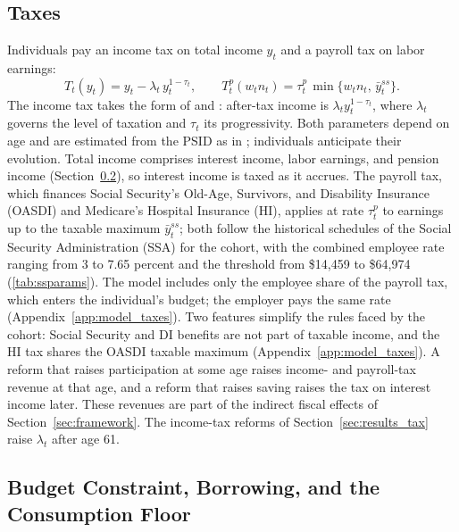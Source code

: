 \subsection{Taxes}\label{sec:model_taxes}

Individuals pay an income tax on total income $y_t$ and a payroll tax on labor earnings:
\begin{equation}\label{eq:tax}
T_t(y_t)=y_t-\lambda_t\,y_t^{1-\tau_t}, \qquad T^p_t(w_t n_t)=\tau^p_t\,\min\{w_t n_t,\,\bar{y}^{ss}_t\}.
\end{equation}
The income tax takes the form of \citet{Benabou2002} and \citet{heathcote2017optimal}: after-tax income is $\lambda_t y_t^{1-\tau_t}$, where $\lambda_t$ governs the level of taxation and $\tau_t$ its progressivity. Both parameters depend on age and are estimated from the PSID as in \citet{Borella2023}; individuals anticipate their evolution. Total income comprises interest income, labor earnings, and pension income (Section~\ref{sec:model_budget}), so interest income is taxed as it accrues. The payroll tax, which finances Social Security's Old-Age, Survivors, and Disability Insurance (OASDI) and Medicare's Hospital Insurance (HI), applies at rate $\tau^p_t$ to earnings up to the taxable maximum $\bar{y}^{ss}_t$; both follow the historical schedules of the Social Security Administration (SSA) for the cohort, with the combined employee rate ranging from 3 to 7.65 percent and the threshold from \$14,459 to \$64,974 (\autoref{tab:ssparams}). The model includes only the employee share of the payroll tax, which enters the individual's budget; the employer pays the same rate (Appendix~\ref{app:model_taxes}). Two features simplify the rules faced by the cohort: Social Security and DI benefits are not part of taxable income, and the HI tax shares the OASDI taxable maximum (Appendix~\ref{app:model_taxes}). A reform that raises participation at some age raises income- and payroll-tax revenue at that age, and a reform that raises saving raises the tax on interest income later. These revenues are part of the indirect fiscal effects of Section~\ref{sec:framework}. The income-tax reforms of Section~\ref{sec:results_tax} raise $\lambda_t$ after age 61.

\subsection{Budget Constraint, Borrowing, and the Consumption Floor}\label{sec:model_budget}

